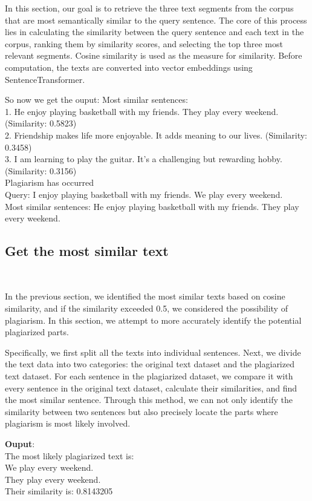 In this section, our goal is to retrieve the three text segments from the corpus that are most semantically similar to the query sentence. The core of this process lies in calculating the similarity between the query sentence and each text in the corpus, ranking them by similarity scores, and selecting the top three most relevant segments. Cosine similarity is used as the measure for similarity. Before computation, the texts are converted into vector embeddings using SentenceTransformer.

So now we get the ouput:
Most similar sentences:\\
1. He enjoy playing basketball with my friends. They play every weekend. (Similarity: 0.5823)\\
2. Friendship makes life more enjoyable. It adds meaning to our lives. (Similarity: 0.3458)\\
3. I am learning to play the guitar. It's a challenging but rewarding hobby. (Similarity: 0.3156)\\
Plagiarism has occurred\\
Query: I enjoy playing basketball with my friends. We play every weekend.\\
Most similar sentences: He enjoy playing basketball with my friends. They play every weekend.

\subsection{Get the most similar text}
\

In the previous section, we identified the most similar texts based on cosine similarity, and if the similarity exceeded 0.5, we considered the possibility of plagiarism. In this section, we attempt to more accurately identify the potential plagiarized parts.

Specifically, we first split all the texts into individual sentences. Next, we divide the text data into two categories: the original text dataset and the plagiarized text dataset. For each sentence in the plagiarized dataset, we compare it with every sentence in the original text dataset, calculate their similarities, and find the most similar sentence. Through this method, we can not only identify the similarity between two sentences but also precisely locate the parts where plagiarism is most likely involved.

\textbf{Ouput}:\\
The most likely plagiarized text is:\\
We play every weekend.\\
They play every weekend.\\
Their similarity is: 0.8143205